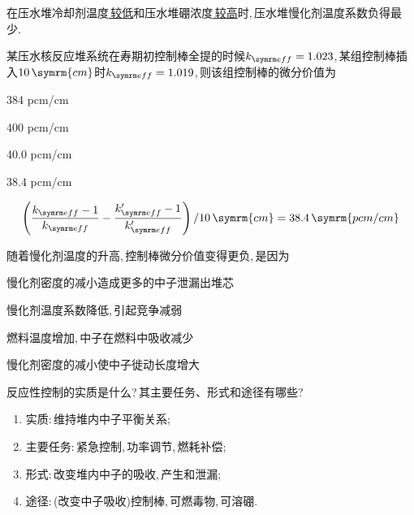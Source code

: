 \begin{exercise}
    在压水堆冷却剂温度\underline{{\kaishu \,较低}}和压水堆硼浓度\underline{{\kaishu \,较高}}时,\,压水堆慢化剂温度系数负得最少.\,
\end{exercise}

\begin{exercise}
    某压水核反应堆系统在寿期初控制棒全提的时候$\keff = 1.023$,\,某组控制棒插入$10\,\symrm{cm}$时$\keff = 1.019$,\,则该组控制棒的微分价值为\xparen
    \begin{xchoices}[showanswer=true]
        \item 384 pcm/cm
        \item 400 pcm/cm
        \item 40.0 pcm/cm
        \item* 38.4 pcm/cm
    \end{xchoices}
    \vspace*{1em}
    \begin{solution}
        \begin{equation*}
            \left(\frac{\keff - 1}{\keff} - \frac{\keff' - 1}{\keff'}\right)/10\,\symrm{cm} = 38.4\,\symrm{pcm/cm}
        \end{equation*}
    \end{solution}
\end{exercise}

\begin{exercise}
    随着慢化剂温度的升高,\,控制棒微分价值变得更负,\,是因为\xparen
    \begin{xchoices}[showanswer=true]
        \item 慢化剂密度的减小造成更多的中子泄漏出堆芯
        \item* 慢化剂温度系数降低,\,引起竞争减弱
        \item 燃料温度增加,\,中子在燃料中吸收减少
        \item 慢化剂密度的减小使中子徙动长度增大
    \end{xchoices}
\end{exercise}

\begin{exercise}
    反应性控制的实质是什么?\,其主要任务、形式和途径有哪些?\,
    \begin{solution}
        \begin{enumerate}[(1)]
            \item 实质:\,维持堆内中子平衡关系;\,
            \item 主要任务:\,紧急控制,\,功率调节,\,燃耗补偿;\,
            \item 形式:\,改变堆内中子的吸收,\,产生和泄漏;\,
            \item 途径:\,(改变中子吸收)控制棒,\,可燃毒物,\,可溶硼.\,
        \end{enumerate}
    \end{solution}
\end{exercise}

